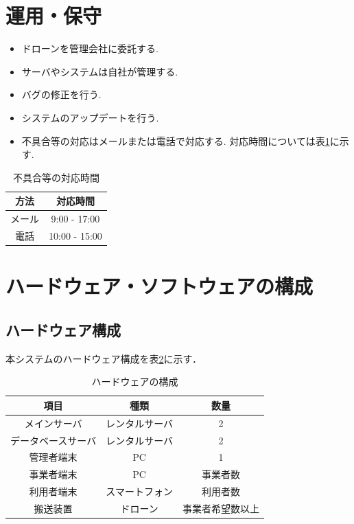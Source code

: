 \documentclass[a4paper, titlepage]{jsarticle}
\begin{document}
\section{運用・保守}
\begin{itemize}
\item ドローンを管理会社に委託する.
\item サーバやシステムは自社が管理する.
\item バグの修正を行う.
\item システムのアップデートを行う.
\item 不具合等の対応はメールまたは電話で対応する. 対応時間については表\ref{tb:huguai}に示す.
\end{itemize}

\begin{table}[htbp]
  \centering
  \begin{tabular}{c|c} \hline
    方法 & 対応時間 \\ \hline
    メール & 9:00 - 17:00 \\
    電話 & 10:00 - 15:00 \\ \hline
  \end{tabular}
  \caption{不具合等の対応時間}
  \label{tb:huguai}
\end{table}

\section{ハードウェア・ソフトウェアの構成}
\subsection{ハードウェア構成}
本システムのハードウェア構成を表\ref{fig:hardware}に示す．
\begin{table}[H]
  \begin{center}
    \caption{ハードウェアの構成}
    \label{fig:hardware}
    \begin{tabular}{ccc} \hline
      項目 & 種類 & 数量 \\ \hline \hline
      メインサーバ & レンタルサーバ & 2 \\
      データベースサーバ & レンタルサーバ & 2 \\
      管理者端末 & PC & 1 \\
      事業者端末 & PC & 事業者数 \\
      利用者端末 & スマートフォン & 利用者数 \\
      搬送装置 & ドローン & 事業者希望数以上 \\ \hline
    \end{tabular}
  \end{center}
\end{table}
\end{document}
